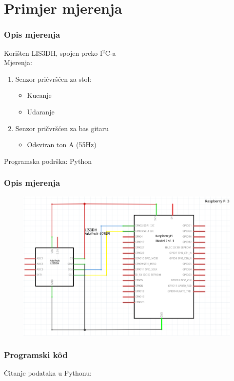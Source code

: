 \documentclass[12pt]{beamer}
\begin{document}
\section{Primjer mjerenja}
\begin{frame}
	\frametitle{Opis mjerenja}
	Korišten LIS3DH, spojen preko I$^2$C-a \\
	Mjerenja:
	\begin{enumerate}
		\item Senzor pričvršćen za stol:
		\begin{itemize}
			\item Kucanje
			\item Udaranje
		\end{itemize}
		\item Senzor pričvršćen za bas gitaru
			\begin{itemize}
			\item Odsviran ton A (55Hz)
		\end{itemize}
	\end{enumerate}
	Programska podrška: Python
\end{frame}


\begin{frame}
	\frametitle{Opis mjerenja}
	\begin{figure}[h]
		\centering
		\includegraphics[width=0.8\linewidth]{slike/lisRpiI2C.png}
	\end{figure}
\end{frame}

\begin{frame}[fragile]
	\frametitle{Programski kôd}
	Čitanje podataka u Pythonu:
	
\end{frame}
\end{document}
